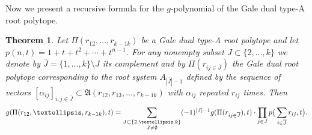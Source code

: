 \documentclass[11pt]{article}
\newtheorem{theorem}[theo]{Theorem}
\theoremstyle{definition}
\numberwithin{equation}{section}
\newcommand{\A}{\mathfrak{A}}
\begin{document}
Now we present a recursive formula for the $g$-polynomial of the Gale dual 
type-A root polytope.

\begin{theorem}\label{recgpoly}  Let $\Pi(r_{12}, \ldots ,r_{k-1 k})$ be a 
Gale dual type-A root polytope and let $p(n,t)=1+t+t^2+ \cdots +t^{n-1}$. For any 
nonempty subset $J\subset\{2, \ldots ,k\}$ we denote by 
$\overline{J}=\{1, \ldots ,k\}\setminus J$ its complement  and  by $\Pi(r_{ij\in 
\overline{J}})$ the Gale dual root polytope corresponding to the root system 
$A_{|\overline{J}|-1}$  defined by the sequence of vectors 
$[\alpha_{ij}]_{i,j\in\overline{J}} \subset \A(r_{12},r_{13}, \ldots ,r_{k-1 k})$ with 
$\alpha_{ij}$ repeated $r_{ij}$ times. Then
\begin{equation*}
g(\Pi(r_{12}, \ldots ,r_{k-1 k}), t) = \sum_{\substack{J\subset\{2, \ldots ,k\} \\ J\neq\emptyset}}  (-1)^{|J|-1}g(\Pi(r_{ij\in \overline{J}}),t)\cdot\prod_{j\in J}p\big{(}\sum_{i\in\overline{J}}r_{ij},t\big{)}.
\end{equation*}
\end{theorem}
\end{document}
